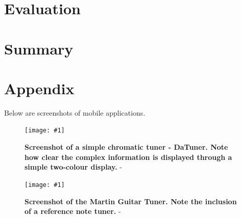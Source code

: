 \documentclass[conference]{acmsiggraph}
\newcommand{\figuremacroW}[4]{
	\begin{figure}[!ht] %
		\centering
		\texttt{[image: \#1]}
		\caption[#2]{\textbf{#2} - #3}
		\label{fig:#1}
	\end{figure}
}
\begin{document}
\section{Evaluation}



\section{Summary}







\clearpage
\newpage

\section{Appendix}

Below are screenshots of mobile applications.

\figuremacroW
{daTune}
{Screenshot of a simple chromatic tuner - DaTuner. Note how clear the complex information is displayed through a simple two-colour display.}
{\protect\cite{DaTune}}
{1.0}

\figuremacroW
{martinTuner}
{Screenshot of the Martin Guitar Tuner. Note the inclusion of a reference note tuner.}
{\protect\cite{Martin}}
{1.0}
\end{document}

